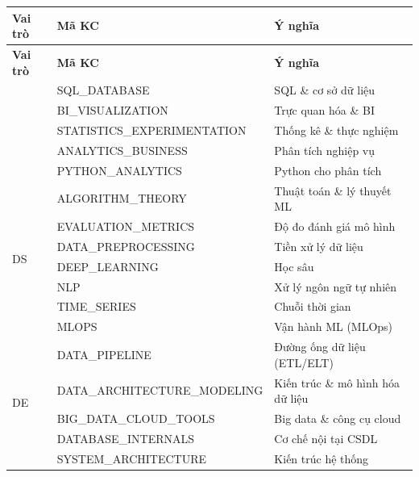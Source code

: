\begin{longtable}{lll}
\toprule
\textbf{Vai trò} & \textbf{Mã KC} & \textbf{Ý nghĩa} \\
\midrule
\endfirsthead
\toprule
\textbf{Vai trò} & \textbf{Mã KC} & \textbf{Ý nghĩa} \\
\midrule
\endhead
\bottomrule
\endfoot
\multirow{5}{*}{DA}
 & SQL\_DATABASE               & SQL \& cơ sở dữ liệu \\
 & BI\_VISUALIZATION           & Trực quan hóa \& BI \\
 & STATISTICS\_EXPERIMENTATION & Thống kê \& thực nghiệm \\
 & ANALYTICS\_BUSINESS         & Phân tích nghiệp vụ \\
 & PYTHON\_ANALYTICS           & Python cho phân tích \\
\midrule
\multirow{7}{*}{DS}
 & ALGORITHM\_THEORY           & Thuật toán \& lý thuyết ML \\
 & EVALUATION\_METRICS         & Độ đo đánh giá mô hình \\
 & DATA\_PREPROCESSING         & Tiền xử lý dữ liệu \\
 & DEEP\_LEARNING              & Học sâu \\
 & NLP                         & Xử lý ngôn ngữ tự nhiên \\
 & TIME\_SERIES                & Chuỗi thời gian \\
 & MLOPS                       & Vận hành ML (MLOps) \\
\midrule
\multirow{5}{*}{DE}
 & DATA\_PIPELINE              & Đường ống dữ liệu (ETL/ELT) \\
 & DATA\_ARCHITECTURE\_MODELING & Kiến trúc \& mô hình hóa dữ liệu \\
 & BIG\_DATA\_CLOUD\_TOOLS      & Big data \& công cụ cloud \\
 & DATABASE\_INTERNALS         & Cơ chế nội tại CSDL \\
 & SYSTEM\_ARCHITECTURE        & Kiến trúc hệ thống \\
\end{longtable}
